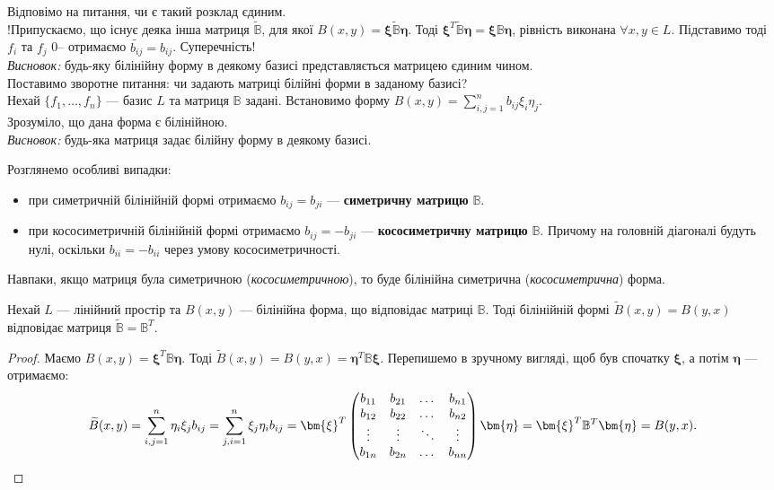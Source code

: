 \documentclass{math_library}
\begin{document}
Відповімо на питання, чи є такий розклад єдиним. \\
!Припускаємо, що існує деяка інша матриця $\widetilde{\mathbb{B}}$, для якої $B(x,y) = \bm{\xi} \widetilde{\mathbb{B}} \bm{\eta}$. Тоді $\bm{\xi}^T \widetilde{\mathbb{B}} \bm{\eta} = \bm{\xi} \mathbb{B} \bm{\eta}$, рівність виконана $\forall x,y \in L$. Підставимо тоді $f_i$ та $f_j$ 0-- отримаємо $\widetilde{b_{ij}} = b_{ij} $. Суперечність!\\
\textit{Висновок:} будь-яку білінійну форму в деякому базисі представляється матрицею єдиним чином.
\bigskip \\
Поставимо зворотне питання: чи задають матриці білійні форми в заданому базисі?\\
Нехай $\{f_1,\dots,f_n\}$ --- базис $L$ та матриця $\mathbb{B}$ задані. Встановимо форму $B(x,y) = \displaystyle\sum_{i,j=1}^n b_{ij}\xi_i \eta_j$.\\
Зрозуміло, що дана форма є білінійною.\\
\textit{Висновок:} будь-яка матриця задає білійну форму в деякому базисі.

\begin{remark}
Розглянемо особливі випадки:
\begin{itemize}[label={-}, nosep, wide=0pt]
\item при симетричній білінійній формі отримаємо $b_{ij} = b_{ji}$ --- \textbf{симетричну матрицю} $\mathbb{B}$.
\item при кососиметричній білінійній формі отримаємо $b_{ij} = -b_{ji}$ --- \textbf{кососиметричну матрицю} $\mathbb{B}$. Причому на головній діагоналі будуть нулі, оскільки $b_{ii} = -b_{ii}$ через умову кососиметричності.
\end{itemize}
Навпаки, якщо матриця була симетричною (\textit{кососиметричною}), то буде білінійна симетрична (\textit{кососиметрична}) форма.
\end{remark}

\begin{proposition}
Нехай $L$ --- лінійний простір та $B(x,y)$ --- білінійна форма, що відповідає матриці $\mathbb{B}$. Тоді білінійній формі $\widetilde{B}(x,y) = B(y,x)$ відповідає матриця $\widetilde{\mathbb{B}} = \mathbb{B}^T$.
\end{proposition}

\begin{proof}
Маємо $B(x,y) = \bm{\xi}^T \mathbb{B} \bm{\eta}$. Тоді $\widetilde{B}(x,y) = B(y,x) = \bm{\eta}^T \mathbb{B} \bm{\xi}$. Перепишемо в зручному вигляді, щоб був спочатку $\bm{\xi}$, а потім $\bm{\eta}$ --- отримаємо:
\[
\widetilde{B}(x,y) = \displaystyle\sum_{i,j=1}^n \eta_i \xi_j b_{ij} = \displaystyle\sum_{j,i=1}^n \xi_j \eta_i b_{ij} = \bm{\xi}^T \begin{pmatrix}
b_{11} & b_{21} & \dots & b_{n1} \\
b_{12} & b_{22} & \dots & b_{n2} \\
\vdots & \vdots & \ddots & \vdots \\
b_{1n} & b_{2n} & \dots & b_{nn} \\
\end{pmatrix} \bm{\eta} = \bm{\xi}^T \mathbb{B}^T \bm{\eta} = B(y,x). \qedhere
\]
\end{proof}
\end{document}
